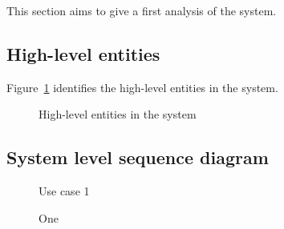 This section aims to give a first analysis of the system.

\subsection{High-level entities}
	Figure~\ref{fig:analysis-model} identifies the high-level entities in the system.
	
	\begin{figure}[H]
		\centering
		\caption{High-level entities in the system}
		\label{fig:analysis-model}
	\end{figure}
	
\subsection{System level sequence diagram}
	\begin{figure}[H]
		\centering
		\begin{msc}{Use case 1}
			
		\end{msc}
		\caption{One}
		\label{smsc:one}
	\end{figure}